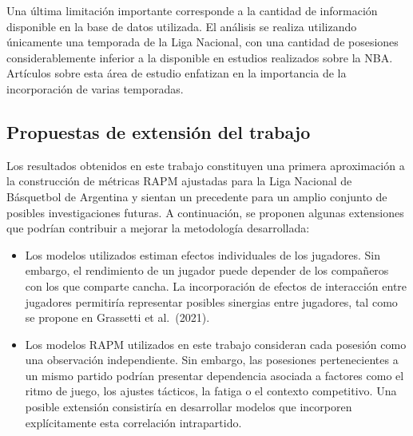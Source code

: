 \documentclass[
  12pt,
]{article}
\providecommand{\tightlist}{%
  \setlength{\itemsep}{0pt}\setlength{\parskip}{0pt}}
\begin{document}
Una última limitación importante corresponde a la cantidad de
información disponible en la base de datos utilizada. El análisis se
realiza utilizando únicamente una temporada de la Liga Nacional, con una
cantidad de posesiones considerablemente inferior a la disponible en
estudios realizados sobre la NBA. Artículos sobre esta área de estudio
enfatizan en la importancia de la incorporación de varias temporadas.

\subsection{Propuestas de extensión del
trabajo}\label{propuestas-de-extensiuxf3n-del-trabajo}

Los resultados obtenidos en este trabajo constituyen una primera
aproximación a la construcción de métricas RAPM ajustadas para la Liga
Nacional de Básquetbol de Argentina y sientan un precedente para un
amplio conjunto de posibles investigaciones futuras. A continuación, se
proponen algunas extensiones que podrían contribuir a mejorar la
metodología desarrollada:

\begin{itemize}
\tightlist
\item
  Los modelos utilizados estiman efectos individuales de los jugadores.
  Sin embargo, el rendimiento de un jugador puede depender de los
  compañeros con los que comparte cancha. La incorporación de efectos de
  interacción entre jugadores permitiría representar posibles sinergias
  entre jugadores, tal como se propone en Grassetti et al.~(2021).
\end{itemize}

\begin{itemize}
\tightlist
\item
  Los modelos RAPM utilizados en este trabajo consideran cada posesión
  como una observación independiente. Sin embargo, las posesiones
  pertenecientes a un mismo partido podrían presentar dependencia
  asociada a factores como el ritmo de juego, los ajustes tácticos, la
  fatiga o el contexto competitivo. Una posible extensión consistiría en
  desarrollar modelos que incorporen explícitamente esta correlación
  intrapartido.
\end{itemize}
\end{document}
